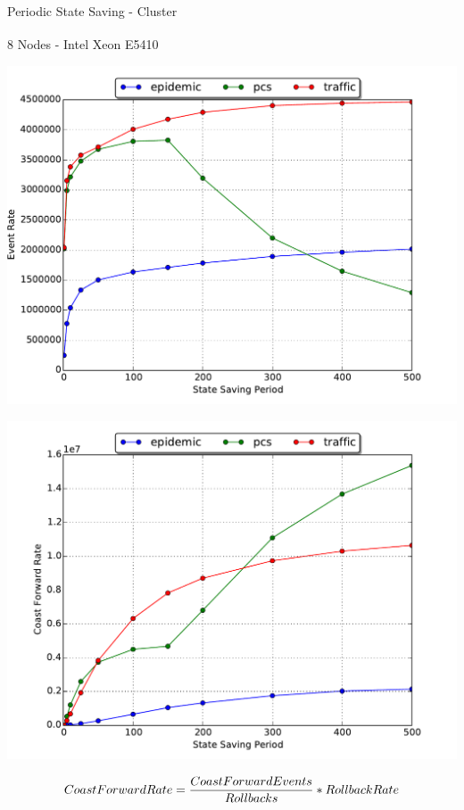 \documentclass[10pt]{beamer}
\begin{document}
\begin{frame}{Periodic State Saving - Cluster}
    \begin{block}{8 Nodes - Intel\textsuperscript{\textregistered} Xeon\textsuperscript{\textregistered} E5410}
        \smallskip
        \begin{minipage}{0.5\textwidth}
            \includegraphics[width=\textwidth]{../figs/state_saving/beowulf/eventrate_500.pdf}
        \end{minipage}%
        \begin{minipage}{0.5\textwidth}
            \includegraphics[width=\textwidth]{../figs/state_saving/beowulf/cf_rate_500.pdf}
        \end{minipage}
    $$ CoastForwardRate = {CoastForwardEvents \over Rollbacks} * RollbackRate $$
    \end{block}
\end{frame}
\end{document}
